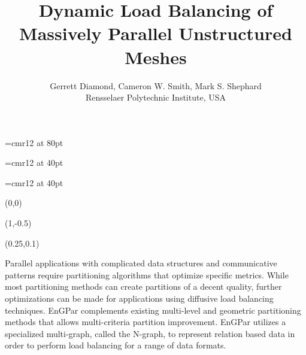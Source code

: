 \documentclass{beamer}
\begin{document}
\font\titlefont=cmr12 at 80pt
\title[]
{\titlefont
  Dynamic Load Balancing of \\[0.3cm]Massively Parallel Unstructured Meshes
}
\font\authorfont=cmr12 at 40pt
\author[G. Diamond]{\authorfont
  Gerrett Diamond, Cameron W. Smith, Mark S. Shephard\\
  Rensselaer Polytechnic Institute, USA}
\date{}
\font\abstractfont=cmr12 at 40pt
\begin{textblock}{15.8}(0,0)
  \titlepage
  \begin{textblock}{14}(1,-0.5)
    \begin{block}{}
      \begin{textblock}{13.5}(0.25,0.1)
      \begin{center}
        \abstractfont
        
      Parallel applications with complicated data structures and communicative patterns
      require partitioning algorithms that optimize specific metrics. While most
      partitioning methods can create partitions of a decent quality, further
      optimizations can be made for applications using diffusive load balancing techniques.
      EnGPar complements existing multi-level and geometric partitioning methods that allows
      multi-criteria partition improvement. EnGPar utilizes a specialized multi-graph, called
      the N-graph, to represent relation based data in order to perform load balancing for a
      range of data formats.
      \end{center}
      \end{textblock}
      \vspace{6.5cm}
    \end{block}
  \end{textblock}
\end{textblock}
\end{document}
